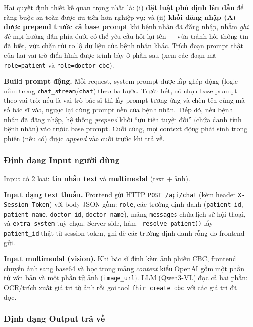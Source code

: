 \documentclass[a4paper,13pt,3p,oneside]{report}
\theoremstyle{definition}
\theoremstyle{remark}
\theoremstyle{definition}
\begin{document}
Hai quyết định thiết kế quan trọng nhất là: (i) \textbf{đặt luật phủ định lên đầu} để ràng buộc an toàn được ưu tiên hơn nghiệp vụ; và (ii) \textbf{khối đăng nhập (A) được prepend trước cả base prompt} khi bệnh nhân đã đăng nhập, nhằm \textit{ghi đè} mọi hướng dẫn phía dưới có thể yêu cầu hỏi lại tên --- vừa tránh hỏi thông tin đã biết, vừa chặn rủi ro lộ dữ liệu của bệnh nhân khác. Trích đoạn prompt thật của hai vai trò điển hình được trình bày ở phần sau (xem các đoạn mã \texttt{role=patient} và \texttt{role=doctor\_cbc}).

\textbf{Build prompt động.} Mỗi request, system prompt được lắp ghép động (logic nằm trong \texttt{chat\_stream}/\texttt{chat}) theo ba bước. Trước hết, nó chọn base prompt theo vai trò: nếu là vai trò bác sĩ thì lấy prompt tương ứng và chèn tên cùng mã số bác sĩ vào, ngược lại dùng prompt nền của bệnh nhân. Tiếp đó, nếu bệnh nhân đã đăng nhập, hệ thống \textit{prepend} khối ``ưu tiên tuyệt đối'' (chứa danh tính bệnh nhân) vào trước base prompt. Cuối cùng, mọi context động phát sinh trong phiên (nếu có) được \textit{append} vào cuối trước khi trả về.

\subsubsection{Định dạng Input người dùng}

Input có 2 loại: \textbf{tin nhắn text} và \textbf{multimodal} (text + ảnh).

\textbf{Input dạng text thuần.} Frontend gửi HTTP \texttt{POST /api/chat} (kèm header \texttt{X-Session-Token}) với body JSON gồm: \texttt{role}, các trường định danh (\texttt{patient\_id}, \texttt{patient\_name}, \texttt{doctor\_id}, \texttt{doctor\_name}), mảng \texttt{messages} chứa lịch sử hội thoại, và \texttt{extra\_system} tuỳ chọn. Server-side, hàm \texttt{\_resolve\_patient()} lấy \texttt{patient\_id} thật từ session token, ghi đè các trường định danh rỗng do frontend gửi.

\textbf{Input multimodal (vision).} Khi bác sĩ đính kèm ảnh phiếu CBC, frontend chuyển ảnh sang base64 và bọc trong mảng \textit{content} kiểu OpenAI gồm một phần tử văn bản và một phần tử ảnh (\texttt{image\_url}). LLM (Qwen3-VL) đọc cả hai phần: OCR/trích xuất giá trị từ ảnh rồi gọi tool \texttt{fhir\_create\_cbc} với các giá trị đã đọc.

\subsubsection{Định dạng Output trả về}
\end{document}
